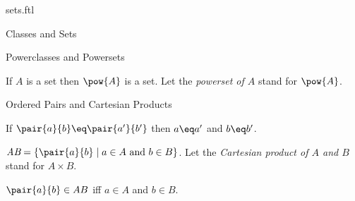 \documentclass{naproche-library}
\begin{document}
\begin{smodule}{sets.ftl}
\begin{sfragment}{Classes and Sets}
\begin{sfragment}{Powerclasses and Powersets}
    \begin{axiom*}[forthel,title=Powerset Axiom,id=PowersetAx]
      If $A$ is a set then $\pow{A}$ is a set.
      Let the \emph{powerset of $A$} stand for $\pow{A}$.
    \end{axiom*}
  \end{sfragment}

  \begin{sfragment}{Ordered Pairs and Cartesian Products}
    \begin{axiom*}[forthel,title=Pair Extensionality Axiom,id=PairExtensionalityAx]
      If $\pair{a}{b}\eq \pair{a'}{b'}$ then $a\eq a'$ and $b\eq b'$.
    \end{axiom*}

    \begin{definition*}[forthel,id=CartesianProductDef]
      $\emph{A\times B}=\{\pair{a}{b}\mid a\in A\text{ and }b\in B\}$.
      Let the \emph{Cartesian product of $A$ and $B$} stand for $A\times B$.
    \end{definition*}

    \begin{proposition*}[forthel,id=CartesianProductProp]
      $\pair{a}{b}\in A\times B$ iff $a\in A$ and $b\in B$.
    \end{proposition*}
  \end{sfragment}
\end{sfragment}
\end{smodule}
\end{document}
